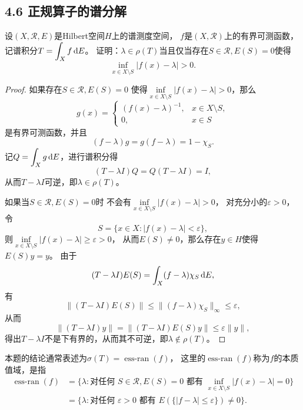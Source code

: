\subsection{4.6 正规算子的谱分解}
\begin{5}
    设$(X,\mathcal{R},E)$是Hilbert空间$H$上的谱测度空间，
    $f$是$(X,\mathcal{R})$上的有界可测函数，
    记谱积分$\displaystyle T=\int_Xf\,{\rm d}E$。
    证明：$\lambda\in\rho(T)$当且仅当存在$S\in\mathcal{R},E(S)=0$使得
    \[\inf_{x \in X \setminus S}|f(x)-\lambda|>0.\]
\end{5}
\begin{proof}
    如果存在$S\in\mathcal{R},E(S)=0$
    使得$\inf\limits_{x \in X \setminus S}|f(x)-\lambda|>0$，那么
    \[g(x)=\begin{cases}
        (f(x)-\lambda)^{-1},&x \in X \setminus S,\\
        0,&x \in S
    \end{cases}\]
    是有界可测函数，并且
    \[(f-\lambda)g=g(f-\lambda)=1-\chi_{S}.\]
    记$\displaystyle Q=\int_Xg\,{\rm d}E$，进行谱积分得
    \[(T-\lambda I)Q=Q(T-\lambda I)=I,\]
    从而$T-\lambda I$可逆，即$\lambda\in\rho(T)$。

    如果当$S\in\mathcal{R},E(S)=0$时
    不会有$\inf\limits_{x \in X \setminus S}|f(x)-\lambda|>0$，
    对充分小的$\varepsilon>0$，令
    \[S=\{x \in X:|f(x)-\lambda|<\varepsilon\},\]
    则$\inf\limits_{x \in X \setminus S}|f(x)-\lambda|\geqslant\varepsilon>0$，
    从而$E(S)\ne0$，那么存在$y \in H$使得$E(S)y=y$。
    由于
    \[(T-\lambda I)E(S)=\int_X(f-\lambda)\chi_S\,{\rm d}E,\]
    有
    \[\|(T-\lambda I)E(S)\|\leqslant\|(f-\lambda)\chi_S\|_\infty\leqslant\varepsilon,\]
    从而
    \[\|(T-\lambda I)y\|=\|(T-\lambda I)E(S)y\|\leqslant\varepsilon\|y\|,\]
    得出$T-\lambda I$不是下有界的，从而其不可逆，即$\lambda\notin\rho(T)$。
\end{proof}
\begin{remark*}
本题的结论通常表述为$\sigma(T)=\operatorname{ess-ran}(f)$，
这里的$\operatorname{ess-ran}(f)$称为$f$的本质值域，是指
\begin{align*}
    \operatorname{ess-ran}(f)&=\{\lambda:\text{对任何 }S\in\mathcal{R},E(S)=0
    \text{ 都有 }\inf_{x \in X \setminus S}|f(x)-\lambda|=0\}\\
    &=\{\lambda:\text{对任何 }\varepsilon>0
    \text{ 都有 }E(\{|f-\lambda|\leqslant\varepsilon\})\ne0\}.
\end{align*}
\end{remark*}

